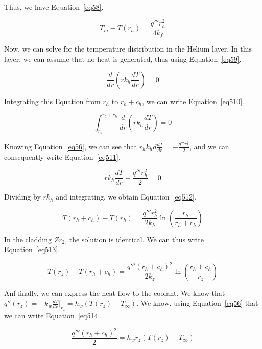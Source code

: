 Thus, we have Equation~\ref{eq58}.

\begin{equation}\label{eq58}
T_m - T(r_h) = \frac{q''' r_h^2}{4k_f}
\end{equation}

Now, we can solve for the temperature distribution in the Helium layer. In this layer, we can assume that no heat is generated, thus using Equation~\ref{eq59}.


\begin{equation}\label{eq59}
\frac{d}{dr}\left( rk_h\frac{dT}{dr}\right) = 0
\end{equation}

Integrating this Equation from $r_h$ to $r_h + c_h$, we can write Equation~\ref{eq510}.


\begin{equation}\label{eq510}
\int_{r_h}^{r_h+c_h}\frac{d}{dr}\left( rk_h\frac{dT}{dr}\right) = 0
\end{equation}

Knowing Equation~\ref{eq56}, we can see that $r_hk_hd\frac{dT}{dr} = -\frac{q'''r_h^2}{2}$, and we can consequently write Equation~\ref{eq511}.

\begin{equation}\label{eq511}
rk_h\frac{dT}{dr} + \frac{q'''r_h^2}{2} = 0
\end{equation}

Dividing by $rk_h$ and integrating, we obtain Equation~\ref{eq512}.



\begin{equation}\label{eq512}
T(r_h+c_h)-T(r_h) = \frac{q'''r_h^2}{2k_h} \ln \left( \frac{r_h}{r_h+c_h} \right)
\end{equation}


In the cladding $Zr_2$, the solution is identical. We can thus write Equation~\ref{eq513}.

\begin{equation}\label{eq513}
T(r_z)-T(r_h+c_h) = \frac{q'''(r_h+c_h)^2}{2k_z} \ln \left( \frac{r_h+c_h}{r_z} \right)
\end{equation}

Anf finally, we can express the heat flow to the coolant. We know that $q''(r_z)=-k_w\frac{dT}{dr}\bigg\rvert_{r_z} = h_w(T(r_z)-T_{\infty})$. We know, using Equation~\ref{eq56} that we can write Equation~\ref{eq514}.

\begin{equation}\label{eq514}
\frac{q'''(r_h+c_h)^2}{2} = h_wr_z(T(r_z)-T_{\infty})
\end{equation}


